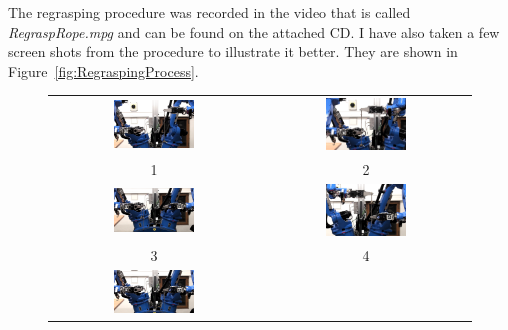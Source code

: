         The regrasping procedure was recorded in the video that is called \textit{RegraspRope.mpg} and can be found on the attached CD. I have also taken a few screen shots from the procedure to illustrate it better. They are shown in Figure~\ref{fig:RegraspingProcess}.

        \begin{figure}[h]
            \centering
            \begin{tabular}{c|c}
            \includegraphics[width=0.4\textwidth]{Img/regrasping/RegraspInit.png}
            &
            \includegraphics[width=0.4\textwidth]{Img/regrasping/Regrasping.png} \\
            1 & 2 \\
            \hline
            \includegraphics[width=0.4\textwidth]{Img/regrasping/RopeDownLeft.png}
            &
            \includegraphics[width=0.4\textwidth]{Img/regrasping/RegraspingRight.png} \\
            3 & 4 \\
            \hline
            \includegraphics[width=0.4\textwidth]{Img/regrasping/RopeDownRight.png}

\end{tabular}
\end{figure}
